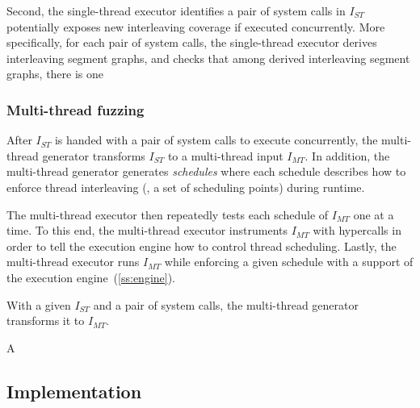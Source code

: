 Second, the single-thread executor identifies a pair of system calls
in $I_{ST}$ potentially exposes new interleaving coverage if executed
concurrently.
%
More specifically, for each pair of system calls, the single-thread
executor derives interleaving segment graphs, and checks that among
derived interleaving segment graphs, there is one 
%



\subsubsection{Multi-thread fuzzing}
%
After $I_{ST}$ is handed with a pair of system calls to execute
concurrently, the multi-thread generator transforms $I_{ST}$ to a
multi-thread input $I_{MT}$.
%
In addition, the multi-thread generator generates \textit{schedules}
where each schedule describes how to enforce thread interleaving (\ie,
a set of scheduling points) during runtime.


The multi-thread executor then repeatedly tests each schedule of
$I_{MT}$ one at a time.
%
To this end, the multi-thread executor instruments $I_{MT}$ with
hypercalls in order to tell the execution engine how to control thread
scheduling.
%
Lastly, the multi-thread executor runs $I_{MT}$ while enforcing a
given schedule with a support of the execution
engine~(\autoref{ss:engine}).




%





With a given $I_{ST}$ and a pair of system calls, the multi-thread
generator transforms it to $I_{MT}$.




%
A 





\subsection{Implementation}
\label{ss:impl}


